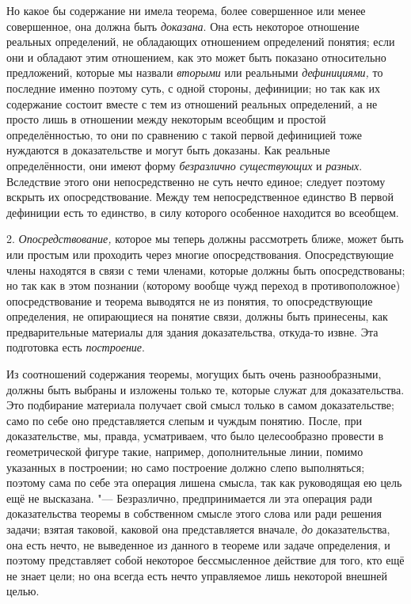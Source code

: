 Но какое бы содержание ни имела теорема, более совершенное или
менее совершенное, она должна быть
{\em доказана}. Она есть
некоторое отношение реальных определений, не обладающих отношением
определений понятия; если они и обладают этим отношением, как это может
быть показано относительно предложений, которые мы назвали
{\em вторыми} или реальными {\em дефинициями,}
то последние именно поэтому суть, с одной стороны, дефиниции;
но так как их содержание состоит вместе с тем из отношений реальных
определений, а не просто лишь в отношении между некоторым всеобщим и
простой определённостью, то они по сравнению с такой первой дефиницией тоже
нуждаются в доказательстве и могут быть доказаны. Как реальные
определённости, они имеют форму {\em безразлично существующих} и {\em разных}.
Вследствие этого они непосредственно не суть нечто единое;
следует поэтому вскрыть их опосредствование. Между тем непосредственное
единство В первой дефиниции есть то единство, в силу которого особенное
находится во всеобщем.

2. {\em Опосредствование,} которое мы теперь должны рассмотреть ближе, может
быть или простым или проходить через многие опосредствования. Опосредствующие
члены находятся в связи с теми членами, которые должны быть опосредствованы;
но так как в этом познании (которому вообще чужд переход в противоположное)
опосредствование и теорема выводятся не из
понятия,
то опосредствующие определения, не опирающиеся на понятие
связи, должны быть принесены, как предварительные материалы для здания
доказательства, откуда-то извне. Эта подготовка есть {\em построение}.

Из соотношений содержания теоремы, могущих быть очень
разнообразными, должны быть выбраны и изложены только те, которые служат
для доказательства. Это подбирание материала получает свой смысл только в
самом доказательстве; само по себе оно представляется слепым и чуждым
понятию. После, при доказательстве, мы, правда, усматриваем, что было
целесообразно провести в геометрической фигуре такие, например, дополнительные
линии, помимо указанных в построении; но само построение должно слепо
выполняться; поэтому сама по себе эта операция лишена смысла, так как
руководящая ею цель ещё не высказана. "--- Безразлично,
предпринимается ли эта операция ради доказательства теоремы в собственном
смысле этого слова или ради решения задачи; взятая таковой, каковой она
представляется вначале, {\em до}
доказательства, она есть нечто, не выведенное из данного в
теореме или задаче определения, и поэтому представляет собой некоторое
бессмысленное действие для того, кто ещё не знает цели; но она всегда есть
нечто управляемое лишь некоторой внешней целью.

